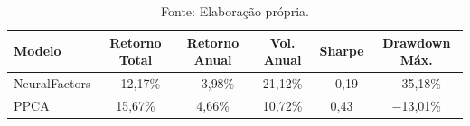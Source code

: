 \begin{table}[H]
\centering
\caption{Desempenho do Backtest de Portfólio — Conjunto de Teste}
\label{tab:sharpe}
\begin{tabular}{lccccc}
\hline
\textbf{Modelo}
  & \textbf{Retorno Total}
  & \textbf{Retorno Anual}
  & \textbf{Vol. Anual}
  & \textbf{Sharpe}
  & \textbf{Drawdown Máx.} \\
\hline
NeuralFactors & $-$12{,}17\% & $-$3{,}98\% & 21{,}12\% & $-$0{,}19 & $-$35{,}18\% \\
PPCA          &    15{,}67\% &   4{,}66\%  & 10{,}72\% &    0{,}43 & $-$13{,}01\% \\
\hline
\end{tabular}
\caption*{Fonte: Elaboração própria.}
\end{table}